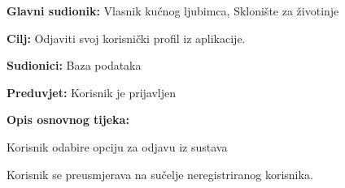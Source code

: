 \pagebreak
\noindent {}
\begin{packed_item}

	\item \textbf{Glavni sudionik: }Vlasnik kućnog ljubimca, Sklonište za životinje
	\item  \textbf{Cilj:} Odjaviti svoj korisnički profil iz aplikacije.
	\item  \textbf{Sudionici:} Baza podataka
	\item  \textbf{Preduvjet:} Korisnik je prijavljen
	\item  \textbf{Opis osnovnog tijeka:}

	\item[] \begin{packed_enum}

		\item Korisnik odabire opciju za odjavu iz sustava
		\item Korisnik se preusmjerava na sučelje neregistriranog korisnika.
	\end{packed_enum}
\end{packed_item}

